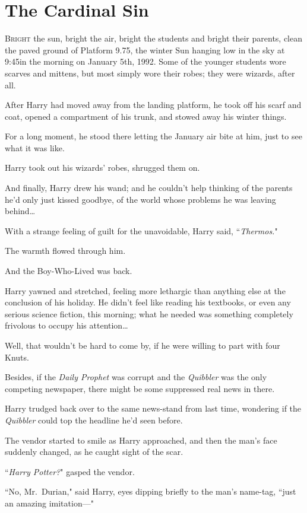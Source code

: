 \chapter{The Cardinal Sin}

\lettrine{B}{right} the sun, bright the air, bright the students and bright their parents, clean the paved ground of Platform 9.75, the winter Sun hanging low in the sky at 9:45\am in the morning on January 5th, 1992. Some of the younger students wore scarves and mittens, but most simply wore their robes; they were wizards, after all.

After Harry had moved away from the landing platform, he took off his scarf and coat, opened a compartment of his trunk, and stowed away his winter things.

For a long moment, he stood there letting the January air bite at him, just to see what it was like.

Harry took out his wizards' robes, shrugged them on.

And finally, Harry drew his wand; and he couldn't help thinking of the parents he'd only just kissed goodbye, of the world whose problems he was leaving behind{\ldots}

With a strange feeling of guilt for the unavoidable, Harry said, ``\emph{Thermos.}"

The warmth flowed through him.

And the Boy-Who-Lived was back.

Harry yawned and stretched, feeling more lethargic than anything else at the conclusion of his holiday. He didn't feel like reading his textbooks, or even any serious science fiction, this morning; what he needed was something completely frivolous to occupy his attention{\ldots}

Well, that wouldn't be hard to come by, if he were willing to part with four Knuts.

Besides, if the \emph{Daily Prophet} was corrupt and the \emph{Quibbler} was the only competing newspaper, there might be some suppressed real news in there.

Harry trudged back over to the same news-stand from last time, wondering if the \emph{Quibbler} could top the headline he'd seen before.

The vendor started to smile as Harry approached, and then the man's face suddenly changed, as he caught sight of the scar.

``\emph{Harry Potter?}" gasped the vendor.

``No, Mr.~Durian," said Harry, eyes dipping briefly to the man's name-tag, ``just an amazing imitation---"

